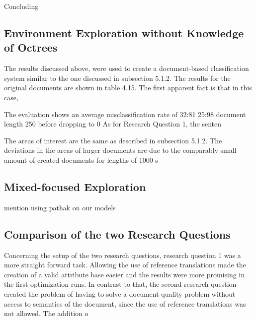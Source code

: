         

        Concluding
    
    \subsection{Environment Exploration without Knowledge of Octrees}
        The results discussed above, were used to create a document-based classiﬁcation system
        similar to the one discussed in subsection 5.1.2. The results for the original documents are
        shown in table 4.15. The ﬁrst apparent fact is that in this case,
        
        The evaluation shows an average misclassiﬁcation rate of 32:81%
        25:98%
        document length 250 before dropping to 0%
        As for Research Question 1, the senten
        
        
        The areas of interest are the same as described in subsection 5.1.2. The deviations in the
        areas of larger documents are due to the comparably small amount of created documents
        for lengths of 1000 s

    \subsection{Mixed-focused Exploration} \label{chap5:mixed-focused}
    
            mention using pathak on our models

    \subsection{Comparison of the two Research Questions}

        Concerning the setup of the two research questions, research question 1 was a more
        straight forward task. Allowing the use of reference translations made the creation of
        a valid attribute base easier and the results were more promising in the ﬁrst optimization
        runs. In contrast to that, the second research question created the problem of having to
        solve a document quality problem without access to semantics of the document, since the
        use of reference translations was not allowed. The addition o
        
